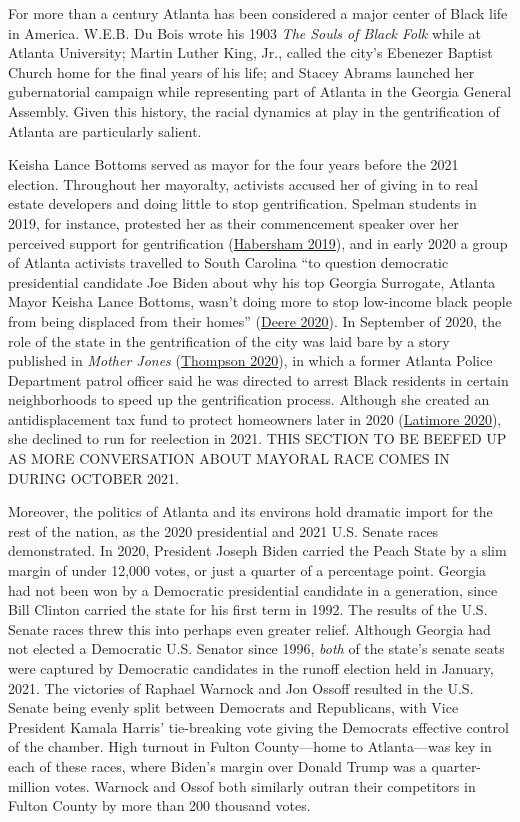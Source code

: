 \documentclass[
  12pt,
]{article}
\begin{document}
For more than a century Atlanta has been considered a major center of Black life in America. W.E.B. Du Bois wrote his 1903 \emph{The Souls of Black Folk} while at Atlanta University; Martin Luther King, Jr., called the city's Ebenezer Baptist Church home for the final years of his life; and Stacey Abrams launched her gubernatorial campaign while representing part of Atlanta in the Georgia General Assembly. Given this history, the racial dynamics at play in the gentrification of Atlanta are particularly salient.

Keisha Lance Bottoms served as mayor for the four years before the 2021 election. Throughout her mayoralty, activists accused her of giving in to real estate developers and doing little to stop gentrification. Spelman students in 2019, for instance, protested her as their commencement speaker over her perceived support for gentrification (\protect\hyperlink{ref-Habersham2019}{Habersham 2019}), and in early 2020 a group of Atlanta activists travelled to South Carolina ``to question democratic presidential candidate Joe Biden about why his top Georgia Surrogate, Atlanta Mayor Keisha Lance Bottoms, wasn't doing more to stop low-income black people from being displaced from their homes'' (\protect\hyperlink{ref-Deere2020}{Deere 2020}). In September of 2020, the role of the state in the gentrification of the city was laid bare by a story published in \emph{Mother Jones} (\protect\hyperlink{ref-Thompson2020}{Thompson 2020}), in which a former Atlanta Police Department patrol officer said he was directed to arrest Black residents in certain neighborhoods to speed up the gentrification process. Although she created an antidisplacement tax fund to protect homeowners later in 2020 (\protect\hyperlink{ref-Latimore2020}{Latimore 2020}), she declined to run for reelection in 2021. THIS SECTION TO BE BEEFED UP AS MORE CONVERSATION ABOUT MAYORAL RACE COMES IN DURING OCTOBER 2021.

Moreover, the politics of Atlanta and its environs hold dramatic import for the rest of the nation, as the 2020 presidential and 2021 U.S. Senate races demonstrated. In 2020, President Joseph Biden carried the Peach State by a slim margin of under 12,000 votes, or just a quarter of a percentage point. Georgia had not been won by a Democratic presidential candidate in a generation, since Bill Clinton carried the state for his first term in 1992. The results of the U.S. Senate races threw this into perhaps even greater relief. Although Georgia had not elected a Democratic U.S. Senator since 1996, \emph{both} of the state's senate seats were captured by Democratic candidates in the runoff election held in January, 2021. The victories of Raphael Warnock and Jon Ossoff resulted in the U.S. Senate being evenly split between Democrats and Republicans, with Vice President Kamala Harris' tie-breaking vote giving the Democrats effective control of the chamber. High turnout in Fulton County---home to Atlanta---was key in each of these races, where Biden's margin over Donald Trump was a quarter-million votes. Warnock and Ossof both similarly outran their competitors in Fulton County by more than 200 thousand votes.
\end{document}
